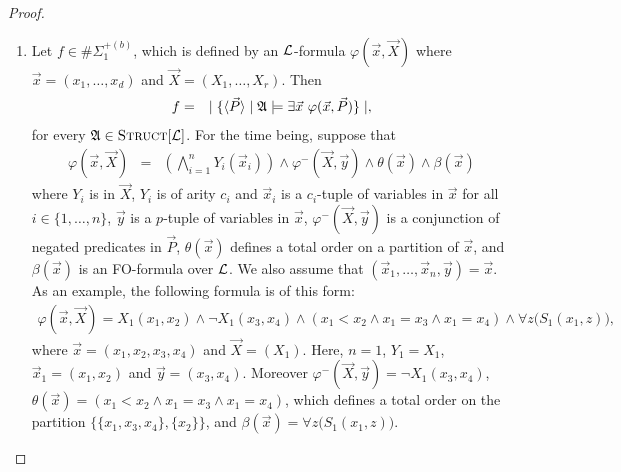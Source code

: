 \documentclass[12pt]{article}
\def\A{{\frak A}}
\def\L{{\cal L}}
\def\P{\vec{P}}
\def\X{\vec{X}}
\def\x{\vec{x}} %
\def\y{\vec{y}} %
\begin{document}
\begin{proof}
\begin{enumerate}
\item Let $f \in \#\Sigma_1^{+(b)}$, which is defined by an $\L$-formula $\varphi(\x,\X)$ where $\x = (x_1,\dots,x_d)$ and $\X = (X_1,\dots,X_r)$. Then
\begin{eqnarray*}
f &=& \mid \{ \langle\P\rangle \mid \A \models \exists \x \ \varphi(\x,\P) \} \mid \label{f1},
\end{eqnarray*}
for every $\A \in \textsc{Struct}[\L]$. For the time being, suppose that
\begin{eqnarray}
\varphi(\x,\X) &=& \left( \bigwedge_{i=1}^n Y_i(\x_i) \right) \wedge \varphi^{-}(\X,\y) \wedge \theta(\x) \wedge \beta(\x)
\end{eqnarray}
where $Y_i$ is in $\X$, $Y_i$ is of arity $c_i$ and $\x_i$ is a $c_i$-tuple of variables in $\x$ for all $i \in \{1,\dots,n\}$, $\y$ is a $p$-tuple of variables in $\x$, $\varphi^{-}(\X,\y)$ is a conjunction of negated predicates in $\P$, $\theta(\x)$ defines a total order on a partition of $\x$, and $\beta(\x)$ is an FO-formula over $\L$. We also assume that $(\x_1,\dots,\x_n,\y) = \x$. As an example, the following formula is of this form:
\begin{align*}
\varphi(\x,\X) =  X_1(x_1,x_2) \wedge \neg X_1(x_3,x_4) \wedge (x_1 < x_2 \wedge x_1 = x_3 \wedge x_1 = x_4 ) \wedge \forall z\big( S_1(x_1,z) \big),
\end{align*}
where $\x = (x_1,x_2,x_3,x_4)$ and $\X = (X_1)$. Here, $n = 1$, $Y_1 = X_1$, $\x_1 = (x_1,x_2)$ and $\y = (x_3,x_4)$. Moreover $\varphi^{-}(\X,\y) = \neg X_1(x_3,x_4)$, $\theta(\x) = (x_1 < x_2 \wedge x_1 = x_3 \wedge x_1 = x_4)$, which defines a total order on the partition $\{\{x_1,x_3,x_4\},\{x_2\}\}$, and $\beta(\x) = \forall z\big( S_1(x_1,z) \big)$.


\end{enumerate}
\end{proof}
\end{document}
